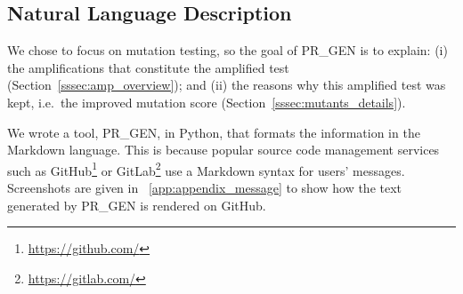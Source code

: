 \documentclass[a4paper,11pt]{sdm_internship}
\newcommand{\todo}[1]{\colorbox{Red!75}{\textcolor{white}{\textbf{TODO\ifx&#1&\else: #1\fi}}}}
\newcommand{\prgen}{PR\_GEN\xspace}
\theoremstyle{definition}
\begin{document}



\subsection{Natural Language Description}%
\label{ssec:nl_description}

We chose to focus on mutation testing, so the goal of \prgen{} is to explain: (i) the amplifications that constitute the amplified test (Section~\ref{sssec:amp_overview}); and (ii) the reasons why this amplified test was kept, i.e.\ the improved mutation score (Section~\ref{sssec:mutants_details}).

We wrote a tool, \prgen{}, in Python, that formats the information in the Markdown language.
This is because popular source code management services such as GitHub\footnote{\url{https://github.com/}} or GitLab\footnote{\url{https://gitlab.com/}} use a Markdown syntax for users' messages.
Screenshots are given in \appendixname~\ref{app:appendix_message} to show how the text generated by \prgen{} is rendered on GitHub.


\end{document}

